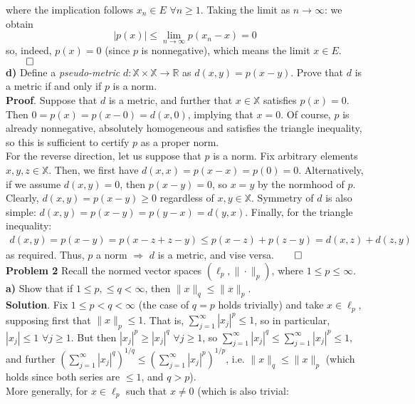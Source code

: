 \documentclass[10pt]{article}
\newcommand{\mbb}[1]{\mathbb{#1}}
\newcommand{\1}[1]{\mathbbm{1}_{#1}}
\begin{document}
    where the implication follows $x_n\in E$ $\forall n\geq 1$. Taking the limit
    as $n\rightarrow\infty$: we obtain
    \[|p(x)|\leq\lim_{n\rightarrow\infty}p(x_n-x)=0\] so, indeed, $p(x)=0$
    (since $p$ is nonnegative), which means the limit $x\in
    E$.\hfill{$\qed$}\\[5pt]
    {\bf d)} Define a {\it pseudo-metric} $d:\mbb{X}\times\mbb{X}\rightarrow
    \mbb{R}$ as $d(x,y)=p(x-y)$. Prove that $d$ is a metric if and only if $p$
    is a norm.\\[5pt]
    {\bf Proof}. Suppose that $d$ is a metric, and further that $x\in\mbb{X}$
    satisfies $p(x)=0$. Then $0=p(x)=p(x-0)=d(x,0)$, implying that $x=0$. Of
    course, $p$ is already nonnegative, absolutely homogeneous and satisfies the
    triangle inequality, so this is sufficient to certify $p$ as a proper
    norm.\\[5pt]
    For the reverse direction, let us suppose that $p$ is a norm. Fix arbitrary
    elements $x,y,z\in\mbb{X}$. Then, we first have $d(x,x)=p(x-x)=p(0)=0$.
    Alternatively, if we assume $d(x,y)=0$, then $p(x-y)=0$, so $x=y$ by the
    normhood of $p$. Clearly, $d(x,y)=p(x-y)\geq 0$ regardless of
    $x,y\in\mbb{X}$. Symmetry of $d$ is also simple:
    $d(x,y)=p(x-y)=p(y-x)=d(y,x)$. Finally, for the triangle inequality:
    \begin{align*}
        d(x,y)=p(x-y)=p(x-z+z-y)\leq p(x-z)+p(z-y)=d(x,z)+d(z,y)
    \end{align*}
    as required. Thus, $p$ a norm $\Rightarrow$ $d$ is a metric, and vise
    versa.\hfill{$\qed$}\\[5pt]
    {\bf Problem 2} Recall the normed vector spaces $(\ell_p,\|\cdot\|_p)$,
    where $1\leq p\leq \infty$.\\[5pt]
    {\bf a)} Show that if $1\leq p,\leq q<\infty$, then $\|x\|_q\leq
    \|x\|_p$.\\[5pt]
    {\bf Solution}. Fix $1\leq p<q<\infty$ (the case of $q=p$ holds trivially)
    and take $x\in\ell_p$, supposing first that $\|x\|_p\leq 1$. That is,
    $\sum_{j=1}^\infty|x_j|^p\leq 1$, so in particular, $|x_j|\leq 1$ $\forall
    j\geq 1$. But then $|x_j|^p\geq |x_j|^q$ $\forall j\geq 1$, so
    $\sum_{j=1}^\infty|x_j|^q\leq \sum_{j=1}^\infty|x_j|^p\leq 1$, and further
    $(\sum_{j=1}^\infty|x_j|^q)^{1/q}\leq (\sum_{j=1}^\infty|x_j|^p)^{1/p}$,
    i.e. $\|x\|_q\leq\|x\|_p$ (which holds since both series are $\leq 1$, and
    $q>p$).\\[5pt]
    More generally, for $x\in\ell_p$ such that $x\neq 0$ (which is also trivial:
\end{document}
